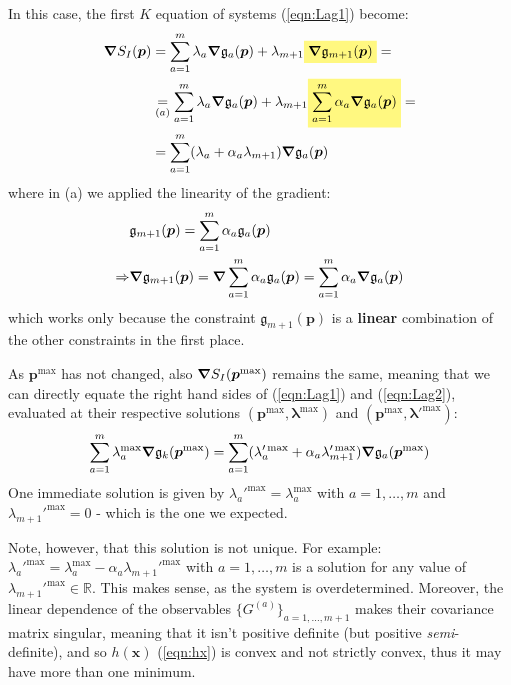 \documentclass[../../main.tex]{subfiles}
\begin{document}
\begin{exo}
    \medskip

    In this case, the first $K$ equation of systems (\ref{eqn:Lag1}) become:
    \begin{align} \nonumber
        \grad S_I(\bm{p}) &= \sum_{a=1}^m \lambda_a \grad \mathfrak g_a(\bm{p}) + \lambda_{m+1}  \hlc{Yellow}{\grad \mathfrak{g}_{m+1}(\bm{p})} =\\ \nonumber
        &\underset{(a)}{=}  \sum_{a=1}^m \lambda_a \grad \mathfrak g_a(\bm{p}) + \lambda_{m+1} \hlc{Yellow}{\sum_{a=1}^m \alpha_a \grad \mathfrak{g}_a(\bm{p})} =\\
        &= \sum_{a=1}^m (\lambda_a + \alpha_a \lambda_{m+1}) \grad \mathfrak g_a(\bm{p}) \label{eqn:Lag2}
    \end{align}
    where in (a) we applied the linearity of the gradient:
    \begin{align*}
        &\mathfrak{g}_{m+1}(\bm{p}) = \sum_{a=1}^m \alpha_a \mathfrak{g}_a (\bm{p}) \\
        \Rightarrow 
        &\grad \mathfrak{g}_{m+1} (\bm{p}) = \grad \sum_{a=1}^m \alpha_a \mathfrak{g}_a (\bm{p}) = \sum_{a=1}^m \alpha_a \grad \mathfrak{g}_a(\bm{p}) 
    \end{align*}
    which works only because the constraint $\mathfrak{g}_{m+1}(\bm{p})$ is a \textbf{linear} combination of the other constraints in the first place.

    As $\bm{p}^{\max}$ has not changed, also $\grad S_I(\bm{p}^{\max})$ remains the same, meaning that we can directly equate the right hand sides of (\ref{eqn:Lag1}) and (\ref{eqn:Lag2}), evaluated at their respective solutions $(\bm{p}^{\max}, \bm{\lambda}^{\max})$ and $(\bm{p}^{\max}, \bm{\lambda'}^{\max})$:
    \begin{align*}
        \sum_{a=1}^m \lambda_a^{\max} \grad \mathfrak{g}_k (\bm{p}^{\max}) = \sum_{a=1}^m (\lambda_a'^{\max} + \alpha_a \lambda_{m+1}'^{\max}) \grad \mathfrak g_a(\bm{p}^{\max})
    \end{align*}
    One immediate solution is given by $\lambda_a'^{\max} = \lambda_a^{\max}$ with $a=1,\dots,m$ and $\lambda_{m+1}'^{\max} = 0$ - which is the one we expected.

    \medskip

    Note, however, that this solution is not unique. For example: $\lambda_a'^{\max} = \lambda_a^{\max} - \alpha_a \lambda_{m+1}'^{\max}$ with $a=1,\dots,m$ is a solution for any value of $\lambda_{m+1}'^{\max} \in \mathbb{R}$. This makes sense, as the system is overdetermined. Moreover, the linear dependence of the observables $\{G^{(a)}\}_{a=1,\dots,m+1}$ makes their covariance matrix singular, meaning that it isn't positive definite (but positive \textit{semi}-definite), and so $h(\bm{x})$ (\ref{eqn:hx}) is convex and not strictly convex, thus it may have more than one minimum.

\end{exo}
\end{document}
